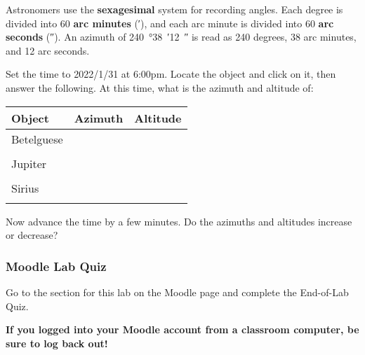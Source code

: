 \documentclass[main.tex]{subfiles}
\begin{document}
Astronomers use the \textbf{sexagesimal} system for recording angles. Each degree is divided into 60 \textbf{arc minutes} (\si{\arcminute}), and each arc minute is divided into 60 \textbf{arc seconds} (\si{\arcsecond}). An azimuth of \SI{240}{\degree}\SI{38}{\arcminute}\SI{12}{\arcsecond} is read as 240 degrees, 38 arc minutes, and 12 arc seconds.

Set the time to 2022/1/31 at 6:00pm. Locate the object and click on it, then answer the following. At this time, what is the azimuth and altitude of: 
\begin{center}
\begin{tabular}{|l|p{5cm}|p{5cm}|}\hline
Object & Azimuth & Altitude \\\hline
Betelguese & & \\
&&\\\hline
Jupiter & & \\
&&\\\hline
Sirius & & \\
&&\\\hline
\end{tabular}
\end{center}
   
Now advance the time by a few minutes. Do the azimuths and altitudes increase or decrease?

\subsubsection{Moodle Lab Quiz}
Go to the section for this lab on the Moodle page and complete the End-of-Lab Quiz.

\textbf{If you logged into your Moodle account from a classroom computer, be sure to log back out!}
\end{document}

